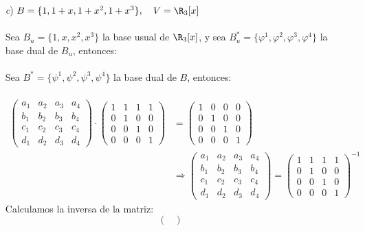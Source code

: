 \begin{ejercicio}
\begin{itemize}
		\item[\textit{c})] $B = \{ 1, 1+x, 1 +x^2, 1 +x^3\}, \quad V = \R_3[x]$ \\ \\
			Sea $B_u = \{ 1,x,x^2,x^3\}$ la base usual de $\R_3[x]$, y sea $B_u^{*} = \{ \varphi^1,\varphi^2,\varphi^3,\varphi^4\}$ la base dual de $B_u$, entonces:
			\\ \\
			Sea $B^* = \{ \psi ^1,\psi ^2,\psi ^3,\psi ^4\}$ la base dual de $B$, entonces: \\ \\
			\begin{align*}
				\begin{pmatrix}
					a_1 & a_2 & a_3 & a_4 \\
					b_1 & b_2 & b_3 & b_4 \\
					c_1 & c_2 & c_3 & c_4 \\
					d_1 & d_2 & d_3 & d_4
				\end{pmatrix} \cdot \begin{pmatrix}
					1 & 1 & 1 & 1 \\
					0 & 1 & 0 & 0 \\
					0 & 0 & 1 & 0 \\
					0 & 0 & 0 & 1
				\end{pmatrix} &= \begin{pmatrix}
					1 & 0 & 0 & 0 \\
					0 & 1 & 0 & 0 \\
					0 & 0 & 1 & 0 \\
					0 & 0 & 0 & 1
				\end{pmatrix} \\ &\Rightarrow \begin{pmatrix}
					a_1 & a_2 & a_3 & a_4 \\
					b_1 & b_2 & b_3 & b_4 \\
					c_1 & c_2 & c_3 & c_4 \\
					d_1 & d_2 & d_3 & d_4
				\end{pmatrix} = \begin{pmatrix}
					1 & 1 & 1 & 1 \\
					0 & 1 & 0 & 0 \\
					0 & 0 & 1 & 0 \\
					0 & 0 & 0 & 1
				\end{pmatrix}^{-1}
			\end{align*}
			Calculamos la inversa de la matriz:
			\begin{equation*}
				\begin{pmatrix}

\end{pmatrix}
\end{equation*}
\end{itemize}
\end{ejercicio}
